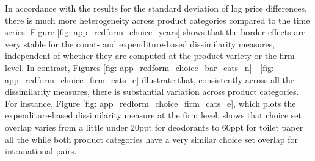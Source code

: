 In accordance with the results for the standard deviation of log price differences, there is much more heterogeneity across product categories compared to the time series. Figure \ref{fig: app_redform_choice_years} shows that the border effects are very stable for the count- and expenditure-based dissimilarity measures, independent of whether they are computed at the product variety or the firm level. In contrast, Figures \ref{fig: app_redform_choice_bar_cats_n} - \ref{fig: app_redform_choice_firm_cats_e} illustrate that, consistently across all the dissimilarity measures, there is substantial variation across product categories. For instance, Figure \ref{fig: app_redform_choice_firm_cats_e}, which plots the expenditure-based dissimilarity measure at the firm level, shows that choice set overlap varies from a little under 20ppt for deodorants to 60ppt for toilet paper all the while both product categories have a very similar choice set overlap for intranational pairs.
